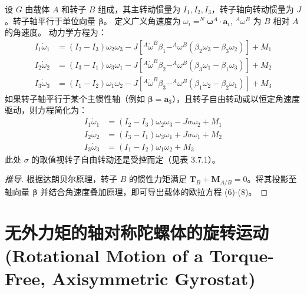 设 \(G\) 由载体 \(A\) 和转子 \(B\) 组成，其主转动惯量为 \(I_1, I_2, I_3\)，转子轴向转动惯量为 \(J\)。转子轴平行于单位向量 \(\boldsymbol{\beta}\)。
定义广义角速度为 \(\omega_i = ^N\boldsymbol{\omega}^A \cdot \mathbf{a}_i, \ ^A\omega^B\) 为 \(B\) 相对 \(A\) 的角速度。
动力学方程为：
\begin{align}
I_1\dot{\omega}_1 &= (I_2 - I_3)\omega_2\omega_3 - J[^A\dot{\omega}^B\beta_1 - ^A\omega^B(\beta_2\omega_3 - \beta_3\omega_2)] + M_1 \tag{6} \\
I_2\dot{\omega}_2 &= (I_3 - I_1)\omega_3\omega_1 - J[^A\dot{\omega}^B\beta_2 - ^A\omega^B(\beta_3\omega_1 - \beta_1\omega_3)] + M_2 \tag{7} \\
I_3\dot{\omega}_3 &= (I_1 - I_2)\omega_1\omega_2 - J[^A\dot{\omega}^B\beta_3 - ^A\omega^B(\beta_1\omega_2 - \beta_2\omega_1)] + M_3 \tag{8}
\end{align}
如果转子轴平行于某个主惯性轴（例如 \(\boldsymbol{\beta} = \mathbf{a}_3\)），且转子自由转动或以恒定角速度驱动，则方程简化为：
\begin{align}
I_1\dot{\omega}_1 &= (I_2 - I_3)\omega_2\omega_3 - J\sigma\omega_2 + M_1 \tag{9} \\
I_2\dot{\omega}_2 &= (I_3 - I_1)\omega_3\omega_1 + J\sigma\omega_1 + M_2 \tag{10} \\
I_3\dot{\omega}_3 &= (I_1 - I_2)\omega_1\omega_2 + M_3 \tag{11}
\end{align}
此处 \(\sigma\) 的取值视转子自由转动还是受控而定（见表 3.7.1）。

\begin{proof}[推导]
根据达朗贝尔原理，转子 \(B\) 的惯性力矩满足 \(\mathbf{T}_B + \mathbf{M}_{A/B} = 0\)。将其投影至轴向量 \(\boldsymbol{\beta}\) 并结合角速度叠加原理，即可导出载体的欧拉方程 (6)-(8)。
\end{proof}

\section{无外力矩的轴对称陀螺体的旋转运动 (Rotational Motion of a Torque-Free, Axisymmetric Gyrostat)}

